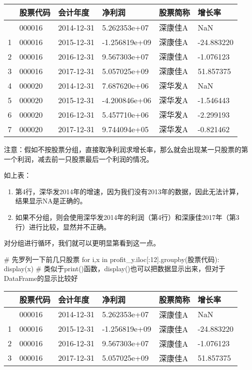 \documentclass[
  letterpaper,
  DIV=11,
  numbers=noendperiod]{scrreprt}
\newenvironment{Shaded}{\begin{snugshade}}{\end{snugshade}}
\newcommand{\CommentTok}[1]{\textcolor[rgb]{0.37,0.37,0.37}{#1}}
\newcommand{\ControlFlowTok}[1]{\textcolor[rgb]{0.00,0.23,0.31}{#1}}
\newcommand{\DecValTok}[1]{\textcolor[rgb]{0.68,0.00,0.00}{#1}}
\newcommand{\KeywordTok}[1]{\textcolor[rgb]{0.00,0.23,0.31}{#1}}
\newcommand{\NormalTok}[1]{\textcolor[rgb]{0.00,0.23,0.31}{#1}}
\newcommand{\StringTok}[1]{\textcolor[rgb]{0.13,0.47,0.30}{#1}}
\providecommand{\tightlist}{%
  \setlength{\itemsep}{0pt}\setlength{\parskip}{0pt}}\usepackage{longtable,booktabs,array}
\begin{document}
\begin{longtable}[]{@{}llllll@{}}
\toprule\noalign{}
& 股票代码 & 会计年度 & 净利润 & 股票简称 & 增长率 \\
\midrule\noalign{}
\endhead
\bottomrule\noalign{}
\endlastfoot
0 & 000016 & 2014-12-31 & 5.262353e+07 & 深康佳A & NaN \\
1 & 000016 & 2015-12-31 & -1.256819e+09 & 深康佳A & -24.883220 \\
2 & 000016 & 2016-12-31 & 9.567303e+07 & 深康佳A & -1.076123 \\
3 & 000016 & 2017-12-31 & 5.057025e+09 & 深康佳A & 51.857375 \\
4 & 000020 & 2014-12-31 & 7.687620e+06 & 深华发A & NaN \\
5 & 000020 & 2015-12-31 & -4.200846e+06 & 深华发A & -1.546443 \\
6 & 000020 & 2016-12-31 & 5.457710e+06 & 深华发A & -2.299193 \\
7 & 000020 & 2017-12-31 & 9.744094e+05 & 深华发A & -0.821462 \\
\end{longtable}

注意：假如不按股票分组，直接取净利润求增长率，那么就会出现某一只股票的第一个利润，减去前一只股票最后一个利润的情况。

如上表：

\begin{enumerate}
\def\labelenumi{\arabic{enumi}.}
\tightlist
\item
  第4行，深华发2014年的增速，因为我们没有2013年的数据，因此无法计算，结果显示NA是正确的。
\item
  如果不分组，则会使用深华发2014年的利润（第4行）和深康佳2017年（第3行）进行比较，显然并不正确。
\end{enumerate}

对分组进行循环，我们就可以更明显第看到这一点。

\begin{Shaded}
\begin{Highlighting}[]
\CommentTok{\# 先罗列一下前几只股票}
\ControlFlowTok{for}\NormalTok{ i,x }\KeywordTok{in}\NormalTok{ profit\_y.iloc[:}\DecValTok{12}\NormalTok{].groupby(}\StringTok{\textquotesingle{}股票代码\textquotesingle{}}\NormalTok{):}
\NormalTok{    display(x) }\CommentTok{\# 类似于print()函数，display()也可以把数据显示出来，但对于DataFrame的显示比较好}
\end{Highlighting}
\end{Shaded}

\begin{longtable}[]{@{}llllll@{}}
\toprule\noalign{}
& 股票代码 & 会计年度 & 净利润 & 股票简称 & 增长率 \\
\midrule\noalign{}
\endhead
\bottomrule\noalign{}
\endlastfoot
0 & 000016 & 2014-12-31 & 5.262353e+07 & 深康佳A & NaN \\
1 & 000016 & 2015-12-31 & -1.256819e+09 & 深康佳A & -24.883220 \\
2 & 000016 & 2016-12-31 & 9.567303e+07 & 深康佳A & -1.076123 \\
3 & 000016 & 2017-12-31 & 5.057025e+09 & 深康佳A & 51.857375 \\
\end{longtable}
\end{document}
